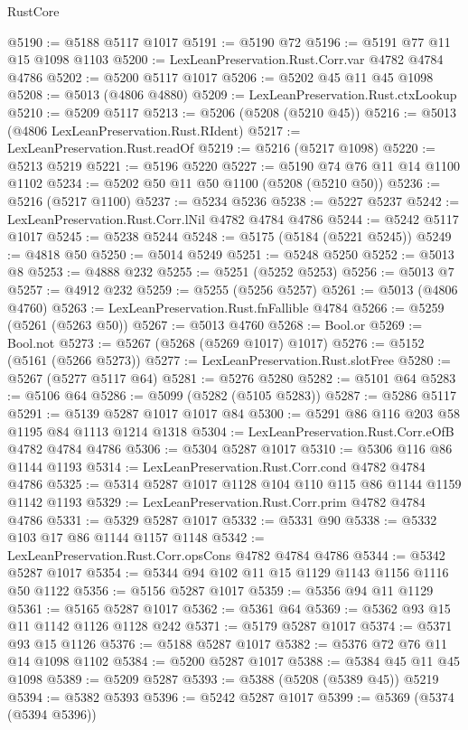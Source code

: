 \begin{lexlean}{RustCore}
\begin{coremodule}
@5190 := @5188 @5117 @1017
@5191 := @5190 @72
@5196 := @5191 @77 @11 @15 @1098 @1103
@5200 := LexLeanPreservation.Rust.Corr.var @4782 @4784 @4786
@5202 := @5200 @5117 @1017
@5206 := @5202 @45 @11 @45 @1098
@5208 := @5013 (@4806 @4880)
@5209 := LexLeanPreservation.Rust.ctxLookup
@5210 := @5209 @5117
@5213 := @5206 (@5208 (@5210 @45))
@5216 := @5013 (@4806 LexLeanPreservation.Rust.RIdent)
@5217 := LexLeanPreservation.Rust.readOf
@5219 := @5216 (@5217 @1098)
@5220 := @5213 @5219
@5221 := @5196 @5220
@5227 := @5190 @74 @76 @11 @14 @1100 @1102
@5234 := @5202 @50 @11 @50 @1100 (@5208 (@5210 @50))
@5236 := @5216 (@5217 @1100)
@5237 := @5234 @5236
@5238 := @5227 @5237
@5242 := LexLeanPreservation.Rust.Corr.lNil @4782 @4784 @4786
@5244 := @5242 @5117 @1017
@5245 := @5238 @5244
@5248 := @5175 (@5184 (@5221 @5245))
@5249 := @4818 @50
@5250 := @5014 @5249
@5251 := @5248 @5250
@5252 := @5013 @8
@5253 := @4888 @232
@5255 := @5251 (@5252 @5253)
@5256 := @5013 @7
@5257 := @4912 @232
@5259 := @5255 (@5256 @5257)
@5261 := @5013 (@4806 @4760)
@5263 := LexLeanPreservation.Rust.fnFallible @4784
@5266 := @5259 (@5261 (@5263 @50))
@5267 := @5013 @4760
@5268 := Bool.or
@5269 := Bool.not
@5273 := @5267 (@5268 (@5269 @1017) @1017)
@5276 := @5152 (@5161 (@5266 @5273))
@5277 := LexLeanPreservation.Rust.slotFree
@5280 := @5267 (@5277 @5117 @64)
@5281 := @5276 @5280
@5282 := @5101 @64
@5283 := @5106 @64
@5286 := @5099 (@5282 (@5105 @5283))
@5287 := @5286 @5117
@5291 := @5139 @5287 @1017 @1017 @84
@5300 := @5291 @86 @116 @203 @58 @1195 @84 @1113 @1214 @1318
@5304 := LexLeanPreservation.Rust.Corr.eOfB @4782 @4784 @4786
@5306 := @5304 @5287 @1017
@5310 := @5306 @116 @86 @1144 @1193
@5314 := LexLeanPreservation.Rust.Corr.cond @4782 @4784 @4786
@5325 := @5314 @5287 @1017 @1128 @104 @110 @115 @86 @1144 @1159 @1142 @1193
@5329 := LexLeanPreservation.Rust.Corr.prim @4782 @4784 @4786
@5331 := @5329 @5287 @1017
@5332 := @5331 @90
@5338 := @5332 @103 @17 @86 @1144 @1157 @1148
@5342 := LexLeanPreservation.Rust.Corr.opsCons @4782 @4784 @4786
@5344 := @5342 @5287 @1017
@5354 := @5344 @94 @102 @11 @15 @1129 @1143 @1156 @1116 @50 @1122
@5356 := @5156 @5287 @1017
@5359 := @5356 @94 @11 @1129
@5361 := @5165 @5287 @1017
@5362 := @5361 @64
@5369 := @5362 @93 @15 @11 @1142 @1126 @1128 @242
@5371 := @5179 @5287 @1017
@5374 := @5371 @93 @15 @1126
@5376 := @5188 @5287 @1017
@5382 := @5376 @72 @76 @11 @14 @1098 @1102
@5384 := @5200 @5287 @1017
@5388 := @5384 @45 @11 @45 @1098
@5389 := @5209 @5287
@5393 := @5388 (@5208 (@5389 @45)) @5219
@5394 := @5382 @5393
@5396 := @5242 @5287 @1017
@5399 := @5369 (@5374 (@5394 @5396))

\end{coremodule}
\end{lexlean}
